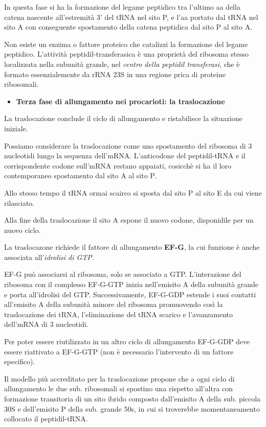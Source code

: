 \documentclass[11pt]{book}
\begin{document}
In questa fase si ha la formazione del legame peptidico tra l'ultimo aa
della catena nascente all'estremità 3' del tRNA nel sito P, e l'aa
portato dal tRNA nel sito A con conseguente spostamento della catena
peptidica dal sito P al sito A.

Non esiste un enzima o fattore proteico che catalizzi la formazione del
legame peptidico. L'attività peptidil-transferasica è una proprietà del
ribosoma stesso localizzata nella subunità grande, nel \emph{centro
della peptidil transferasi}, che è formato essenzialemente da rRNA 23S
in una regione prica di proteine ribosomali.

\begin{itemize}
\itemsep1pt\parskip0pt
\item
  \textbf{Terza fase di allungamento nei procarioti: la traslocazione}
\end{itemize}

La traslocazione conclude il ciclo di allungamento e ristabilisce la
situazione iniziale.

Possiamo considerare la traslocazione come uno spostamento del ribosoma
di 3 nucleotidi lungo la sequenza dell'mRNA. L'anticodone del
peptidil-tRNA e il corrispondente codone sull'mRNA restano appaiati,
cosicchè si ha il loro contemporaneo spostamento dal sito A al sito P.

Allo stesso tempo il tRNA ormai scairco si sposta dal sito P al sito E
da cui viene rilasciato.

Alla fine della traslocazione il sito A espone il nuovo codone,
disponidile per un nuovo ciclo.

La traslocazone richiede il fattore di allungamento \textbf{EF-G}, la
cui funzione è anche associata all'\emph{idrolisi di GTP}.

EF-G può associarsi al ribosoma, solo se associato a GTP. L'interazione
del ribosoma con il complesso EF-G-GTP inizia nell'emisito A della
subunità grande e porta all'idrolisi del GTP. Successivamente, EF-G-GDP
estende i suoi contatti all'emisito A della subunità minore del ribosoma
promuovendo così la traslocazione dei tRNA, l'eliminazione del tRNA
scarico e l'avanzamento dell'mRNA di 3 nucleotidi.

Per poter essere riutilizzato in un altro ciclo di allungamento EF-G-GDP
deve essere riattivato a EF-G-GTP (non è necessario l'intervento di un
fattore specifico).

Il modello più accreditato per la traslocazione propone che a ogni ciclo
di allungamento le due sub. ribosomali si spostino una rispetto
all'altra con formazione transitoria di un sito ibrido composto
dall'emisito A della sub. piccola 30S e dell'emisito P della sub. grande
50s, in cui si troverebbe momentaneamento collocato il peptidil-tRNA.
\end{document}
